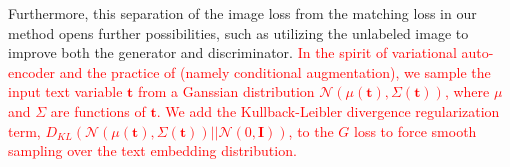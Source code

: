 \documentclass[10pt,twocolumn,letterpaper]{article}
\begin{document}
Furthermore, this separation of the image loss from the matching loss in our method opens further possibilities, such as utilizing the unlabeled image to improve both the generator and discriminator.
\textcolor{red}{In the spirit of variational auto-encoder \cite{} and the practice of \cite{han2017stackgan} (namely conditional augmentation), we sample the input text variable $\bm t$ from a Ganssian distribution $\mathcal{N}(\mu({\bm t}), \Sigma({\bm t}))$, where $\mu$ and $\Sigma$ are functions of $\bm t$. We add the Kullback-Leibler divergence regularization term, $D_{KL}(\mathcal{N}(\mu({\bm t}), \Sigma({\bm t}) )|| \mathcal{N}(0, \bm{I}))$, to the $G$ loss to force smooth sampling over the text embedding distribution. }







\end{document}
